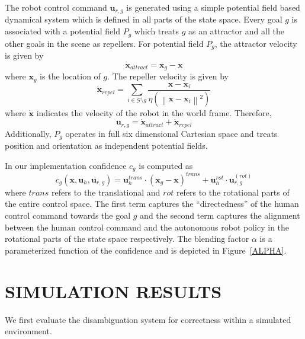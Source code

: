 \documentclass[conference]{IEEEtran}
\newcommand{\norm}[1]{\left\lVert#1\right\rVert}
\begin{document}
The robot control command $\boldsymbol{u}_{r,g}$ is generated using a simple potential field based dynamical system which is defined in all parts of the state space. Every goal $g$ is associated with a potential field $P_g$ which treats $g$ as an attractor and all the other goals in the scene as repellers. For potential field $P_g$, the attractor velocity is given by
\begin{equation*}
\dot{\boldsymbol{x}}_{attract} = \boldsymbol{x}_{g} - \boldsymbol{x}
\end{equation*}
where $\boldsymbol{x}_{g}$ is the location of $g$. The repeller velocity is given by
\begin{equation*}
\dot{\boldsymbol{x}}_{repel} = \sum_{i \in \mathcal{G} \setminus g} \frac{\boldsymbol{x} - \boldsymbol{x}_{i}}{\eta(\norm{\boldsymbol{x} - \boldsymbol{x}_{i}}^2)}
\end{equation*}
where $\dot{\boldsymbol{x}}$ indicates the velocity of the robot in the world frame. Therefore, 
\begin{equation*}
\boldsymbol{u}_{r,g} = \dot{\boldsymbol{x}}_{attract} + \dot{\boldsymbol{x}}_{repel} 
\end{equation*}
Additionally, $P_g$ operates in full six dimensional Cartesian space and treats position and orientation as independent potential fields. 

In our implementation confidence $c_g$ is computed as
\begin{equation}\label{E1}
c_g(\boldsymbol{x}, \boldsymbol{u}_h, \boldsymbol{u}_{r,g}) = \boldsymbol{u}_{h}^{trans}\cdot(\boldsymbol{x}_{g} - \boldsymbol{x})^{trans} + \boldsymbol{u}_h^{rot}\cdot\boldsymbol{u}_{r,g}^{(rot)}
\end{equation}
where $trans$ refers to the translational and $rot$ refers to the rotational parts of the entire control space. 
The first term captures the ``directedness'' of the human control command towards the goal $g$ and the second term captures the alignment between the human control command and the autonomous robot policy in the rotational parts of the state space respectively. 
The blending factor $\alpha$ is a parameterized function of the confidence and is depicted in Figure~\ref{ALPHA}.
 
\section{SIMULATION RESULTS} \label{SIMRESULTS}
We first evaluate the disambiguation system for correctness within a simulated environment.
\end{document}
